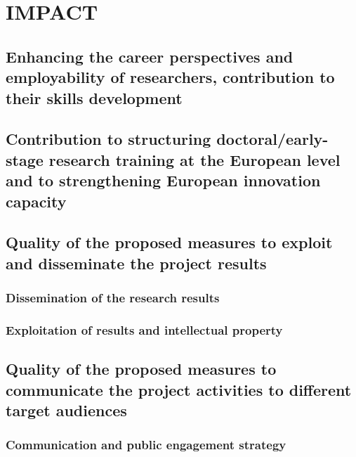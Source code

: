 \documentclass[11pt,a4paper]{article}
\begin{document}
\section{IMPACT}
\subsection{Enhancing the career perspectives and employability of researchers, contribution to their skills development} 

\processdelayedfloats
%
\subsection{Contribution to structuring doctoral/early-stage research training at the European level and to strengthening European innovation capacity}
\label{subsec:ContribToEcon}

\processdelayedfloats
\vspace{-2mm}
\subsection{Quality of the proposed measures to exploit and disseminate the project results}
\label{sec:qualityExploitDissemination}
\subsubsection{Dissemination of the research results}
\label{sec:dissemination}

\subsubsection{Exploitation of results and intellectual property}
\label{sec:exploit}

\vspace{-2mm}
\subsection{Quality of the proposed measures to communicate the project activities to different target audiences}
\subsubsection{Communication and public engagement strategy}
\label{sec:CommPub}

\processdelayedfloats
\vspace{-2mm}
\end{document}
